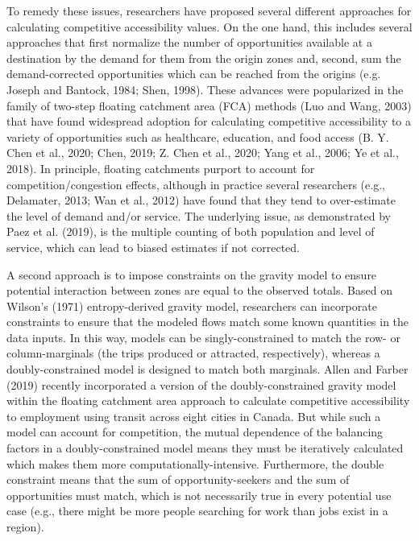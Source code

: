 \documentclass[]{elsarticle} %
\begin{document}
To remedy these issues, researchers have proposed several different
approaches for calculating competitive accessibility values. On the one
hand, this includes several approaches that first normalize the number
of opportunities available at a destination by the demand for them from
the origin zones and, second, sum the demand-corrected opportunities
which can be reached from the origins (e.g. Joseph and Bantock, 1984;
Shen, 1998). These advances were popularized in the family of two-step
floating catchment area (FCA) methods (Luo and Wang, 2003) that have
found widespread adoption for calculating competitive accessibility to a
variety of opportunities such as healthcare, education, and food access
(B. Y. Chen et al., 2020; Chen, 2019; Z. Chen et al., 2020; Yang et al.,
2006; Ye et al., 2018). In principle, floating catchments purport to
account for competition/congestion effects, although in practice several
researchers (e.g., Delamater, 2013; Wan et al., 2012) have found that
they tend to over-estimate the level of demand and/or service. The
underlying issue, as demonstrated by Paez et al. (2019), is the multiple
counting of both population and level of service, which can lead to
biased estimates if not corrected.

A second approach is to impose constraints on the gravity model to
ensure potential interaction between zones are equal to the observed
totals. Based on Wilson's (1971) entropy-derived gravity model,
researchers can incorporate constraints to ensure that the modeled flows
match some known quantities in the data inputs. In this way, models can
be singly-constrained to match the row- or column-marginals (the trips
produced or attracted, respectively), whereas a doubly-constrained model
is designed to match both marginals. Allen and Farber (2019) recently
incorporated a version of the doubly-constrained gravity model within
the floating catchment area approach to calculate competitive
accessibility to employment using transit across eight cities in Canada.
But while such a model can account for competition, the mutual
dependence of the balancing factors in a doubly-constrained model means
they must be iteratively calculated which makes them more
computationally-intensive. Furthermore, the double constraint means that
the sum of opportunity-seekers and the sum of opportunities must match,
which is not necessarily true in every potential use case (e.g., there
might be more people searching for work than jobs exist in a region).
\end{document}
